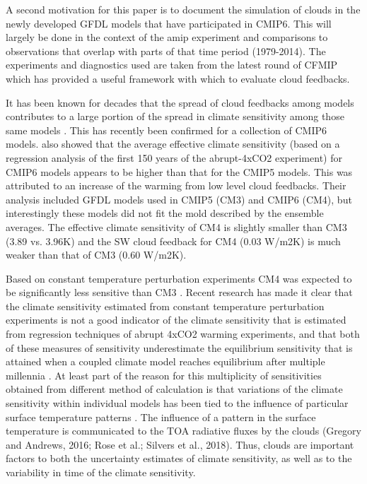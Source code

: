 \documentclass[draft]{agujournal2019}
\begin{document}
A second motivation for this paper is to document the simulation of clouds in the newly developed GFDL models that 
have participated in CMIP6.  This will largely be done in the context of the amip experiment and comparisons to observations
that overlap with parts of that time period (1979-2014).  The experiments and diagnostics used are taken from the latest 
round of CFMIP which has provided a useful framework with which to evaluate cloud feedbacks.       

It has been known for decades that  the spread of cloud feedbacks among models contributes to a large portion of the 
spread in climate sensitivity among those same models \cite{Cess_etal_1989, Bony_Dufresne_2005}.  
This has recently been confirmed \cite{Zelinka_etal_2020} for a collection of CMIP6 models.   also showed that 
the average effective climate sensitivity (based on a regression analysis of the first 150 years of the abrupt-4xCO2 
experiment) for CMIP6 models appears to be higher than that for the CMIP5 models.  This was attributed to an 
increase of the warming from low level cloud feedbacks.  Their analysis included GFDL models used in CMIP5 (CM3) 
and CMIP6 (CM4), but interestingly
these models did not fit the mold described by the ensemble averages.  The effective climate sensitivity of 
CM4 is slightly smaller than CM3 (3.89 vs. 3.96K) and the SW cloud feedback for CM4 (0.03 W/m2K) is much
weaker than that of CM3 (0.60 W/m2K).  

Based on constant temperature perturbation experiments CM4 was expected to be significantly less sensitive 
than CM3 \cite{Zhao_2014}.
Recent research has made it clear that the climate sensitivity estimated from constant temperature perturbation 
experiments is not a good indicator of the climate sensitivity that is estimated from regression techniques of 
abrupt 4xCO2 warming experiments, and that both 
of these measures of sensitivity underestimate the equilibrium sensitivity that is attained when a coupled climate 
model reaches equilibrium after multiple millennia \cite{Paynter_etal_2018,Rugenstein_etal_2020}.     
At least part of the reason for this multiplicity of 
sensitivities obtained from different method of calculation is that variations of the climate sensitivity within 
individual models has been tied to the influence of particular surface temperature patterns 
\cite{Gregory_Andrews_2016, Zhou_etal_2016, Andrews_Webb_2018, Silvers_etal_2018}.   
The influence of a pattern in the surface temperature is communicated to the TOA radiative fluxes by the clouds 
(Gregory and Andrews, 2016; Rose et al.; Silvers et al., 2018).   Thus, clouds are important factors to both the uncertainty 
estimates of climate sensitivity, as well as to the variability in time of the climate sensitivity.  
\end{document}
